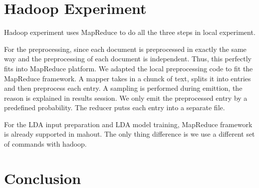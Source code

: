 \documentclass{article}
\begin{document}
\section{Hadoop Experiment}

Hadoop experiment uses MapReduce to do all the three steps in local experiment.

For the preprocessing, since each document is preprocessed in exactly the same way and the preprocessing of each document is independent. Thus, this perfectly fits into MapReduce platform. We adapted the local preprocessing code to fit the MapReduce framework. A mapper takes in a chunck of text, splits it into entries and then preprocess each entry. A sampling is performed during emittion, the reason is explained in results session. We only emit the preprocessed entry by a predefined probability. The reducer putss each entry into a separate file.

For the LDA input preparation and LDA model training, MapReduce framework is already supported in mahout. The only thing difference is we use a different set of commands with hadoop. 

\section{Conclusion}


\end{document}
